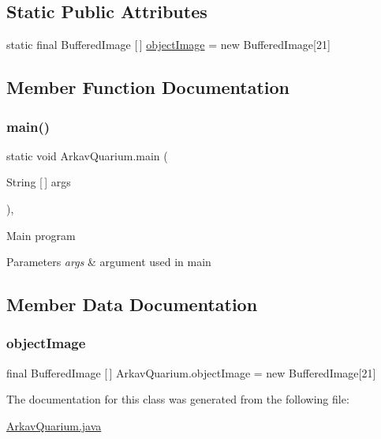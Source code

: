 \subsection*{Static Public Attributes}
\begin{DoxyCompactItemize}
\item 
static final Buffered\+Image \mbox{[}$\,$\mbox{]} \mbox{\hyperlink{class_arkav_quarium_ac006164649b2cb200f410612e8c238da}{object\+Image}} = new Buffered\+Image\mbox{[}21\mbox{]}
\end{DoxyCompactItemize}


\subsection{Member Function Documentation}
\mbox{\label{class_arkav_quarium_acac6b4c3ee0d206eb3fe18e279542d54}} 
\subsubsection{\texorpdfstring{main()}{main()}}
{\footnotesize\ttfamily static void Arkav\+Quarium.\+main (\begin{DoxyParamCaption}\item[{String \mbox{[}$\,$\mbox{]}}]{args }\end{DoxyParamCaption})\hspace{0.3cm}{\ttfamily [inline]}, {\ttfamily [static]}}

Main program 
\begin{DoxyParams}{Parameters}
{\em args} & argument used in main \\
\hline
\end{DoxyParams}


\subsection{Member Data Documentation}
\mbox{\label{class_arkav_quarium_ac006164649b2cb200f410612e8c238da}} 
\subsubsection{\texorpdfstring{object\+Image}{objectImage}}
{\footnotesize\ttfamily final Buffered\+Image \mbox{[}$\,$\mbox{]} Arkav\+Quarium.\+object\+Image = new Buffered\+Image\mbox{[}21\mbox{]}\hspace{0.3cm}{\ttfamily [static]}}



The documentation for this class was generated from the following file\+:\begin{DoxyCompactItemize}
\item 
\mbox{\hyperlink{_arkav_quarium_8java}{Arkav\+Quarium.\+java}}\end{DoxyCompactItemize}
